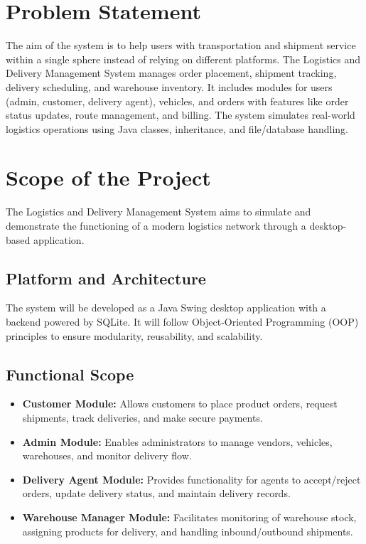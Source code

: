 \documentclass[12pt,a4paper]{article}
\begin{document}
\section*{Problem Statement}
The aim of the system is to help users with transportation and shipment service within a single sphere instead of relying on different platforms. The Logistics and Delivery Management System manages order placement, shipment tracking, delivery scheduling, and warehouse inventory. It includes modules for users (admin, customer, delivery agent), vehicles, and orders with features like order status updates, route management, and billing. The system simulates real-world logistics operations using Java classes, inheritance, and file/database handling.

\section*{Scope of the Project}
The Logistics and Delivery Management System aims to simulate and demonstrate the functioning of a modern logistics network through a desktop-based application.

\subsection*{Platform and Architecture}
The system will be developed as a Java Swing desktop application with a backend powered by SQLite. It will follow Object-Oriented Programming (OOP) principles to ensure modularity, reusability, and scalability.

\subsection*{Functional Scope}
\begin{itemize}[left=1.5em]
  \item \textbf{Customer Module:} Allows customers to place product orders, request shipments, track deliveries, and make secure payments.
  \item \textbf{Admin Module:} Enables administrators to manage vendors, vehicles, warehouses, and monitor delivery flow.
  \item \textbf{Delivery Agent Module:} Provides functionality for agents to accept/reject orders, update delivery status, and maintain delivery records.
  \item \textbf{Warehouse Manager Module:} Facilitates monitoring of warehouse stock, assigning products for delivery, and handling inbound/outbound shipments.
\end{itemize}
\end{document}
